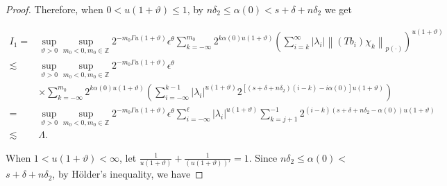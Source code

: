 \documentclass[oneside,reqno]{amsart}
\numberwithin{equation}{section}
\theoremstyle{definition}
\begin{document}
\begin{proof}
Therefore, when $0<u(1+\vartheta) \leq  1$, by $n \delta_{2} \leq  \alpha(0)<s+\delta+n \delta_{2}$ we get


\begin{align*}
 I_{1}= &  \sup_{\vartheta>0 }\sup _{m_0<0, m_0\in  \mathbb{Z}} 2^{-m_0\Gamma u(1+\vartheta)} \epsilon  ^\theta\sum_{k=-\infty}^{m_0} 2^{k \alpha(0) u(1+\vartheta)}\left(\sum_{i=k}^{\infty}\left|\lambda_{i}\right|\left\|\left(T b_{i}\right) \chi_{k}\right\|_{{p(\cdot)}}\right)^{u(1+\vartheta)}\\
\lesssim &  \sup_{\vartheta>0 }\sup _{m_0<0, m_0\in  \mathbb{Z}} 2^{-m_0\Gamma u(1+\vartheta)} \epsilon  ^\theta \\
& \times \sum_{k=-\infty}^{m_0} 2^{k \alpha(0) u(1+\vartheta)}\left(\sum_{i=-\infty}^{k-1}\left|\lambda_{i}\right|^{u(1+\vartheta)} 2^{\left[\left(s+\delta+n \delta_{2}\right)(i-k)-i \alpha(0)\right] u(1+\vartheta)}\right)\\
=& \sup_{\vartheta>0 }\sup _{m_0<0, m_0\in  \mathbb{Z}} 2^{-m_0\Gamma u(1+\vartheta)} \epsilon  ^\theta \sum_{i=-\infty}^{\ell }\left|\lambda_{i}\right|^{u(1+\vartheta)} \sum_{k=j+1}^{-1} 2^{(i-k)\left(s+\delta+n \delta_{2}-\alpha(0)\right) u(1+\vartheta)} \\
 \lesssim & \Lambda  .
\end{align*}




When $1<u(1+\vartheta)<\infty$, let $\frac{1}{u(1+\vartheta)}+ \frac{1}{(u(1+\vartheta))\prime}=1$. Since $n \delta_{2} \leq  \alpha(0)<$ $s+\delta+n \delta_{2}$, by H\"older's inequality, we have



\end{proof}
\end{document}
